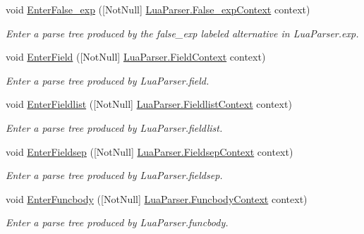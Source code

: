 \begin{DoxyCompactItemize}
void \mbox{\hyperlink{classzlua_1_1_compiler_a2679b9bd28b5726f5b1d45c391d44b1a}{Enter\+False\+\_\+exp}} (\mbox{[}Not\+Null\mbox{]} \mbox{\hyperlink{classzlua_1_1_lua_parser_1_1_false__exp_context}{Lua\+Parser.\+False\+\_\+exp\+Context}} context)
\begin{DoxyCompactList}\small\item\em Enter a parse tree produced by the {\ttfamily false\+\_\+exp} labeled alternative in Lua\+Parser.\+exp. \end{DoxyCompactList}\item 
void \mbox{\hyperlink{classzlua_1_1_compiler_a52a01acfde2fcb93cbec5f59549288da}{Enter\+Field}} (\mbox{[}Not\+Null\mbox{]} \mbox{\hyperlink{classzlua_1_1_lua_parser_1_1_field_context}{Lua\+Parser.\+Field\+Context}} context)
\begin{DoxyCompactList}\small\item\em Enter a parse tree produced by Lua\+Parser.\+field. \end{DoxyCompactList}\item 
void \mbox{\hyperlink{classzlua_1_1_compiler_a4f33b0f6f14a3497db13c22e4d03a10f}{Enter\+Fieldlist}} (\mbox{[}Not\+Null\mbox{]} \mbox{\hyperlink{classzlua_1_1_lua_parser_1_1_fieldlist_context}{Lua\+Parser.\+Fieldlist\+Context}} context)
\begin{DoxyCompactList}\small\item\em Enter a parse tree produced by Lua\+Parser.\+fieldlist. \end{DoxyCompactList}\item 
void \mbox{\hyperlink{classzlua_1_1_compiler_a4cd23e46335e41cd5c30ffae494efbec}{Enter\+Fieldsep}} (\mbox{[}Not\+Null\mbox{]} \mbox{\hyperlink{classzlua_1_1_lua_parser_1_1_fieldsep_context}{Lua\+Parser.\+Fieldsep\+Context}} context)
\begin{DoxyCompactList}\small\item\em Enter a parse tree produced by Lua\+Parser.\+fieldsep. \end{DoxyCompactList}\item 
void \mbox{\hyperlink{classzlua_1_1_compiler_a0ccbdaa518f36c6a9145c36adf12dd2e}{Enter\+Funcbody}} (\mbox{[}Not\+Null\mbox{]} \mbox{\hyperlink{classzlua_1_1_lua_parser_1_1_funcbody_context}{Lua\+Parser.\+Funcbody\+Context}} context)
\begin{DoxyCompactList}\small\item\em Enter a parse tree produced by Lua\+Parser.\+funcbody. \end{DoxyCompactList}\item 

\end{DoxyCompactItemize}
